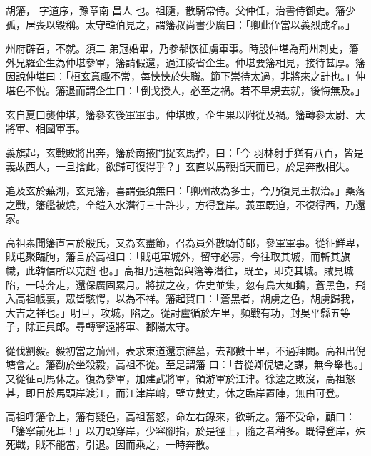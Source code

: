 
\begin{pinyinscope}

 胡籓，
 字道序，豫章南
 昌人
 也。祖隨，散騎常侍。父仲任，治書侍御史。籓少孤，居喪以毀稱。太守韓伯見之，謂籓叔尚書少廣曰：「卿此侄當以義烈成名。」



 州府辟召，不就。須二
 弟冠婚畢，乃參郗恢征虜軍事。時殷仲堪為荊州刺史，籓外兄羅企生為仲堪參軍，籓請假還，過江陵省企生。仲堪要籓相見，接待甚厚。籓因說仲堪曰：「桓玄意趣不常，每怏怏於失職。節下崇待太過，非將來之計也。」仲堪色不悅。籓退而謂企生曰：「倒戈授人，必至之禍。若不早規去就，後悔無及。」



 玄自夏口襲仲堪，籓參玄後軍軍事。仲堪敗，企生果以附從及禍。籓轉參太尉、大將軍、相國軍事。



 義旗起，玄戰敗將出奔，籓於南掖門捉玄馬控，曰：「今
 羽林射手猶有八百，皆是義故西人，一旦捨此，欲歸可復得乎？」玄直以馬鞭指天而已，於是奔散相失。



 追及玄於蕪湖，玄見籓，喜謂張須無曰：「卿州故為多士，今乃復見王叔治。」桑落之戰，籓艦被燒，全鎧入水潛行三十許步，方得登岸。義軍既迫，不復得西，乃還家。



 高祖素聞籓直言於殷氏，又為玄盡節，召為員外散騎侍郎，參軍軍事。從征鮮卑，賊屯聚臨朐，籓言於高祖曰：「賊屯軍城外，留守必寡，今往取其城，而斬其旗幟，此韓信所以克趙
 也。」高祖乃遣檀韶與籓等潛往，既至，即克其城。賊見城陷，一時奔走，還保廣固累月。將拔之夜，佐史並集，忽有鳥大如鵝，蒼黑色，飛入高祖帳裏，眾皆駭愕，以為不祥。籓起賀曰：「蒼黑者，胡虜之色，胡虜歸我，大吉之祥也。」明旦，攻城，陷之。從討盧循於左里，頻戰有功，封吳平縣五等子，除正員郎。尋轉寧遠將軍、鄱陽太守。



 從伐劉毅。毅初當之荊州，表求東道還京辭墓，去都數十里，不過拜闕。高祖出倪塘會之。籓勸於坐殺毅，高祖不從。至是謂籓
 曰：「昔從卿倪塘之謀，無今舉也。」又從征司馬休之。復為參軍，加建武將軍，領游軍於江津。徐逵之敗沒，高祖怒甚，即日於馬頭岸渡江，而江津岸峭，壁立數丈，休之臨岸置陣，無由可登。



 高祖呼籓令上，籓有疑色，高祖奮怒，命左右錄來，欲斬之。籓不受命，顧曰：「籓寧前死耳！」以刀頭穿岸，少容腳指，於是徑上，隨之者稍多。既得登岸，殊死戰，賊不能當，引退。因而乘之，一時奔散。




\end{pinyinscope}

